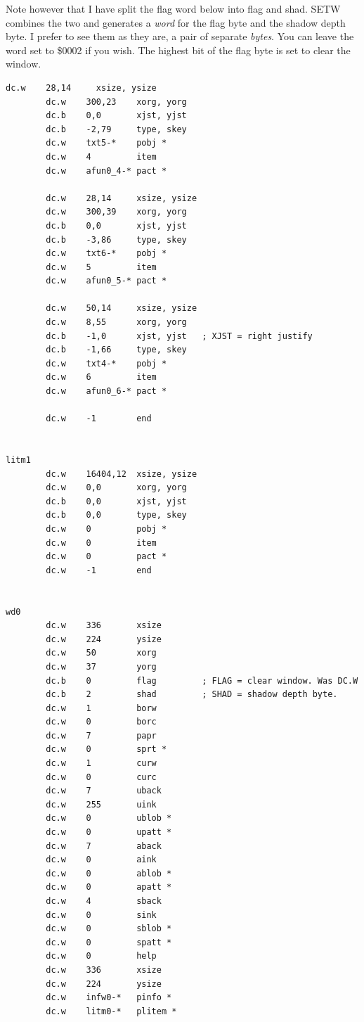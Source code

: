 Note however that I have split the flag word below into flag and
    shad. SETW combines the two and generates a
 \emph{word} for the flag byte and the shadow depth byte. I
    prefer to see them as they are, a pair of separate
 \emph{bytes}. You can leave the word set to \$0002 if you
    wish. The highest bit of the flag byte is set to clear the window.

\begin{lstlisting}[firstnumber=last,caption={LibGenWin\_asm - Remaining Definitions}]
        dc.w    28,14     xsize, ysize
        dc.w    300,23    xorg, yorg
        dc.b    0,0       xjst, yjst
        dc.b    -2,79     type, skey
        dc.w    txt5-*    pobj *
        dc.w    4         item
        dc.w    afun0_4-* pact *
        
        dc.w    28,14     xsize, ysize
        dc.w    300,39    xorg, yorg
        dc.b    0,0       xjst, yjst
        dc.b    -3,86     type, skey
        dc.w    txt6-*    pobj *
        dc.w    5         item
        dc.w    afun0_5-* pact *
        
        dc.w    50,14     xsize, ysize
        dc.w    8,55      xorg, yorg
        dc.b    -1,0      xjst, yjst   ; XJST = right justify
        dc.b    -1,66     type, skey
        dc.w    txt4-*    pobj *
        dc.w    6         item
        dc.w    afun0_6-* pact *
        
        dc.w    -1        end


litm1
        dc.w    16404,12  xsize, ysize
        dc.w    0,0       xorg, yorg
        dc.b    0,0       xjst, yjst
        dc.b    0,0       type, skey
        dc.w    0         pobj *
        dc.w    0         item
        dc.w    0         pact *
        dc.w    -1        end


wd0
        dc.w    336       xsize
        dc.w    224       ysize
        dc.w    50        xorg
        dc.w    37        yorg
        dc.b    0         flag         ; FLAG = clear window. Was DC.W
        dc.b    2         shad         ; SHAD = shadow depth byte.
        dc.w    1         borw
        dc.w    0         borc
        dc.w    7         papr
        dc.w    0         sprt *
        dc.w    1         curw
        dc.w    0         curc
        dc.w    7         uback
        dc.w    255       uink
        dc.w    0         ublob *
        dc.w    0         upatt *
        dc.w    7         aback
        dc.w    0         aink
        dc.w    0         ablob *
        dc.w    0         apatt *
        dc.w    4         sback
        dc.w    0         sink
        dc.w    0         sblob *
        dc.w    0         spatt *
        dc.w    0         help
        dc.w    336       xsize
        dc.w    224       ysize
        dc.w    infw0-*   pinfo *
        dc.w    litm0-*   plitem *
        

\end{lstlisting}
